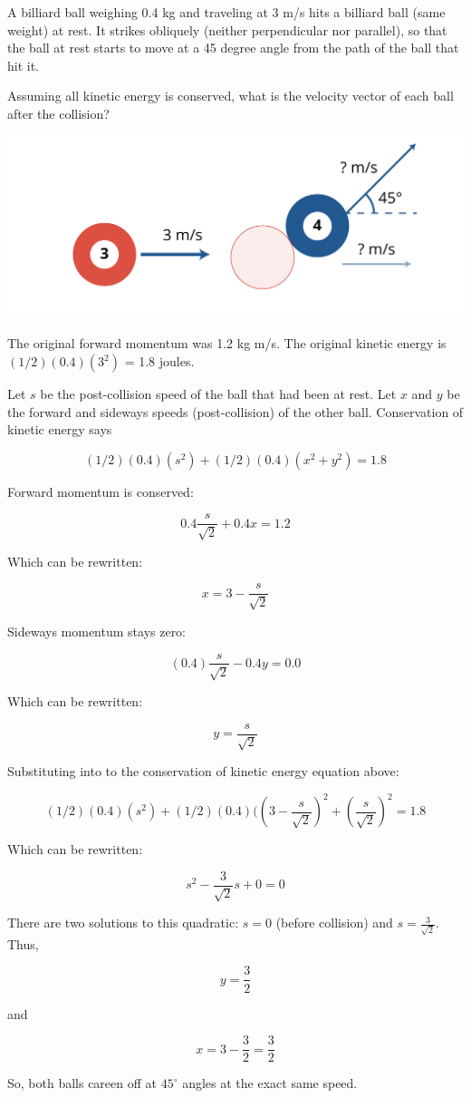 \begin{Exercise}[title={Billiard Balls}, label=billiards]
  
A billiard ball weighing 0.4 kg and traveling at 3 m/s hits a billiard
ball (same weight) at rest. It strikes obliquely (neither perpendicular nor parallel), so that the ball at rest starts to
move at a 45 degree angle from the path of the ball that hit it.

Assuming all kinetic energy is conserved, what is the velocity
vector of each ball after the collision?

\includegraphics[width=.75\textwidth]{poolball.png}

\end{Exercise}
\begin{Answer}[ref=billiards]

  The original forward momentum was 1.2 kg m/s.  The original kinetic energy is $(1/2)(0.4)(3^2)$ = 1.8 joules. 

  Let $s$ be the post-collision speed of the ball that had been at
  rest.  Let $x$ and $y$ be the forward and sideways speeds
  (post-collision) of the other ball. Conservation of kinetic energy says

  $$(1/2)(0.4)(s^2) + (1/2)(0.4)(x^2+y^2) = 1.8$$

  Forward momentum is conserved:

  $$0.4\frac{s}{\sqrt{2}} + 0.4 x = 1.2$$

  Which can be rewritten:

  $$x = 3 - \frac{s}{\sqrt{2}}$$
  
  Sideways momentum stays zero:

  $$(0.4)\frac{s}{\sqrt{2}} - 0.4 y = 0.0$$

  Which can be rewritten:

  $$y = \frac{s}{\sqrt{2}}$$

  Substituting into to the conservation of kinetic energy equation above:

  $$(1/2)(0.4)(s^2) + (1/2)(0.4)(\left(3 - \frac{s}{\sqrt{2}}\right)^2+\left(\frac{s}{\sqrt{2}}\right)^2 = 1.8$$

  Which can be rewritten:

  $$s^2 - \frac{3}{\sqrt{2}} s + 0 = 0$$

  There are two solutions to this quadratic: $s = 0$ (before collision) and $s = \frac{3}{\sqrt{2}}$. Thus,

  $$y = \frac{3}{2}$$

  and

  $$x = 3 - \frac{3}{2} = \frac{3}{2}$$

  So, both balls careen off at $45^\circ$ angles at the exact same speed. 

  
\end{Answer}

